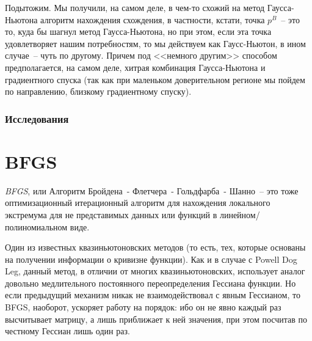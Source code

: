 \documentclass[12pt, a4paper, oneside, final]{article}
\begin{document}
	Подытожим.
	Мы получили, на самом деле, в чем-то схожий на метод Гаусса-Ньютона алгоритм нахождения схождения, в частности, кстати, точка $p^B$~-- это то, куда бы шагнул метод Гаусса-Ньютона, но при этом, если эта точка удовлетворяет нашим потребностям, то мы действуем как Гаусс-Ньютон, в ином случае~-- чуть по другому.
	Причем под <<немного другим>> способом предполагается, на самом деле, хитрая комбинация Гаусса-Ньютона и градиентного спуска (так как при маленьком доверительном регионе мы пойдем по направлению, близкому градиентному спуску).
	\subsubsection*{Исследования}
	\newpage
	\section*{BFGS}
	\textit{BFGS}, или Алгоритм Бройдена~- Флетчера~- Гольдфарба~- Шанно~-- это тоже оптимизационный итерационный алгоритм для нахождения локального экстремума для не представимых данных или функций в линейном/полиномиальном виде.

	Один из известных квазиньютоновских методов (то есть, тех, которые основаны на получении информации о кривизне функции).
	Как и в случае с Powell Dog Leg, данный метод, в отличии от многих квазиньютоновских, использует аналог довольно медлительного постоянного переопределения Гессиана функции.
	Но если предыдущий механизм никак не взаимодействовал с явным Гессианом, то BFGS, наоборот, ускоряет работу на порядок: ибо он не явно каждый раз высчитывает матрицу, а лишь приближает к ней значения, при этом посчитав по честному Гессиан лишь один раз.
\end{document}
